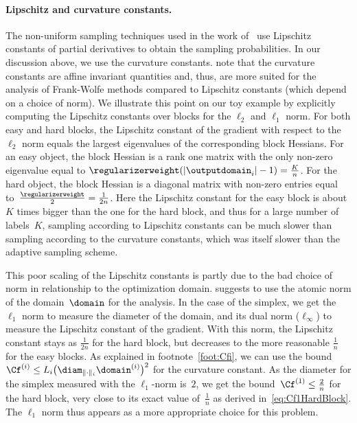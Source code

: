 \documentclass{article}
\begin{document}
\paragraph{Lipschitz and curvature constants.}
The non-uniform sampling techniques used in the work of~\citet{Nesterov:2012fa,needell2014,ZhaoImportanceSampling_ICML15} use Lipschitz constants of partial derivatives to obtain the sampling probabilities.
In our discussion above, we use the curvature constants.
\citet[Appendix C]{LacosteJulien2015linearFW} note that the curvature constants are affine invariant quantities and, thus, are more suited for the analysis of Frank-Wolfe methods compared to Lipschitz constants (which depend on a choice of norm).
We illustrate this point on our toy example by explicitly computing the Lipschitz constants over blocks for the $\ell_2$ and $\ell_1$ norm.
For both easy and hard blocks, the Lipschitz constant of the gradient with respect to the $\ell_2$ norm equals the largest eigenvalues of the corresponding block Hessians.
For an easy object, the block Hessian is a rank one matrix with the only non-zero eigenvalue equal to $\regularizerweight(|\outputdomain_i|-1) = \frac{K}{n}$.
For the hard object, the block Hessian is a diagonal matrix with non-zero entries equal to~$\frac{\regularizerweight}{2} = \frac{1}{2n}$. 
Here the Lipschitz constant for the easy block is about $K$ times bigger than the one for the hard block, and thus for a large number of labels~$K$, sampling according to Lipschitz constants can be much slower than sampling according to the curvature constants, which was itself slower than the adaptive sampling scheme.

This poor scaling of the Lipschitz constants is partly due to the bad choice of norm in relationship to the optimization domain.  suggests to use the atomic norm of the domain~$\domain$ for the analysis. In the case of the simplex, we get the $\ell_1$ norm to measure the diameter of the domain, and its dual norm ($\ell_\infty$) to measure the Lipschitz constant of the gradient. With this norm, the Lipschitz constant stays as $\frac{1}{2n}$ for the hard block, but decreases to the more reasonable $\frac{1}{n}$ for the easy blocks. As explained in footnote~\ref{foot:Cfi}, we can use the bound \mbox{$\Cf^{(i)} \leq L_i \big(\diam_{\|\cdot\|_i} \domain^{(i)} \big)^2$} for the curvature constant. As the diameter for the simplex measured with the $\ell_1$-norm is~$2$, we get the bound~$\Cf^{(1)} \leq \frac{2}{n}$ for the hard block, very close to its exact value of~$\frac{1}{n}$ as derived in~\eqref{eq:Cf1HardBlock}. The $\ell_1$ norm thus appears as a more appropriate choice for this problem.
\end{document}
